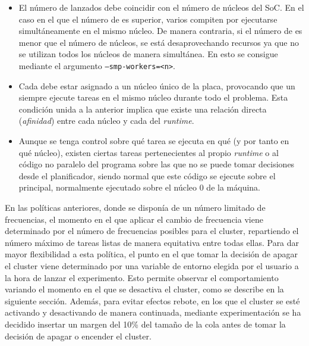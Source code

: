 \begin{itemize}
\item El número de \wts lanzados debe coincidir con el número de núcleos
  del SoC. En el caso en el que el número de \wts es superior, varios \wts
  compiten por ejecutarse simultáneamente en el mismo núcleo. De manera
  contraria, si el número de \wts es menor que el número de núcleos, se
  está desaprovechando recursos ya que no se utilizan todos los núcleos de
  manera simultánea. En \nanos esto se consigue mediante el argumento
  \texttt{--smp-workers=<n>}.
\item Cada \wt debe estar asignado a un núcleo único de la placa,
  provocando que un \wt siempre ejecute tareas en el mismo núcleo durante
  todo el problema. Esta condición unida a la anterior implica que existe
  una relación directa ({\em afinidad}) entre cada núcleo y cada \wt del
  \emph{runtime}.
\item Aunque se tenga control sobre qué tarea se ejecuta en qué \wt (y por
  tanto en qué núcleo), existen ciertas tareas pertenecientes al propio
  \emph{runtime} o al código no paralelo del programa sobre las que no se
  puede tomar decisiones desde el planificador, siendo normal que este
  código se ejecute sobre el \wt principal, normalmente ejecutado sobre el
  núcleo 0 de la máquina.
\end{itemize}


En las políticas anteriores, donde se disponía de un número limitado de
frecuencias, el momento en el que aplicar el cambio de frecuencia viene
determinado por el número de frecuencias posibles para el cluster,
repartiendo el número máximo de tareas listas de manera equitativa entre
todas ellas. Para dar mayor flexibilidad a esta política, el punto en el
que tomar la decisión de apagar el cluster viene determinado por una
variable de entorno elegida por el usuario a la hora de lanzar el
experimento. Esto permite observar el comportamiento variando el momento en
el que se desactiva el cluster, como se describe en la siguiente
sección. Además, para evitar efectos rebote, en los que el cluster se esté
activando y desactivando de manera continuada, mediante experimentación se
ha decidido insertar un margen del 10\% del tamaño de la cola antes de
tomar la decisión de apagar o encender el cluster.

